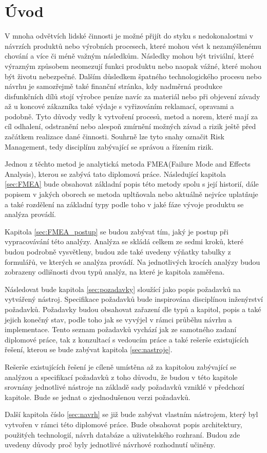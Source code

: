 \chapter{Úvod}
\label{sec:Uvod}
V mnoha odvětvích lidské činnosti je možné přijít do styku s nedokonalostmi v návrzích produktů nebo výrobních procesech, které mohou vést k nezamýšlenému chování a více či méně važným následkům. Následky mohou být triviální, které výrazným způsobem neomezují funkci produktu nebo naopak vážné, které mohou být životu nebezpečné. Dalším důsledkem špatného technologického procesu nebo návrhu je samozřejmě také finanční stránka, kdy nadměrná produkce disfunkčních dílů stojí výrobce peníze navíc za materiál nebo při objevení závady až u koncové zákazníka také výdaje s vyřizováním reklamací, opravami a podobně. Tyto důvody vedly k vytvoření procesů, metod a norem, které mají za cíl odhalení, odstranění nebo alespoň zmírnění možných závad a rizik ještě před začátkem realizace dané činnosti. Souhrně lze tyto snahy označit Risk Management, tedy disciplínu zabývající se správou a řízením rizik. 

Jednou z těchto metod je analytická metoda FMEA(Failure Mode and Effects Analysis), kterou se zabývá tato diplomová práce. Následující kapitola  \ref{sec:FMEA} bude obsahovat základní popis této metody spolu s její historií, dále popisem v jakých oborech se metoda upltňovala nebo aktuálně nejvíce uplatňuje a také rozdělení na základní typy podle toho v jaké fáze vývoje produktu se analýza provádí.

Kapitola \ref{sec:FMEA_postup} se budou zabývat tím, jaký je postup při vypracovávání této analýzy. Analýza se skládá celkem ze sedmi kroků, které budou podrobně vysvětleny, budou zde také uvedeny výňatky tabulky z formulářů, ve kterých se analýza provádí. Na jednotlivých krocích analýzy budou zobrazeny odlišnosti dvou typů analýz, na které je kapitola zaměřena.

Následovat bude kapitola \ref{sec:pozadavky} sloužící jako popis požadavků na vytvářený nástroj. Specifikace požadavků bude inspirována disciplínou inženýrství požadavků. Požadavky budou obsahovat zařazení dle typů a kapitol, popis a také jejich konečný stav, podle toho jak se vyvýjel v rámci průběhu návrhu a implementace. Tento seznam požadavků vychází jak ze samotného zadaní diplomové práce, tak z konzultací s vedoucím práce a také rešerše existujících řešení, kterou se bude zabývat kapitola \ref{sec:nastroje}. 

Rešerše existujících řešení je cíleně umístěna až za kapitolou zabývající se analýzou a specifikací požadavků z toho důvodu, že budou v této kapitole srovnány jednotlivé nástroje na základě sady požadavků vzniklé v předchozí kapitole. Bude se jednat o zjednodušenou verzi požadavků. 

Další kapitola číslo \ref{sec:navrh} se již bude zabývat vlastním nástrojem, který byl vytvořen v rámci této diplomové práce. Bude obsahovat popis architektury, použitých technologií, návrh databáze a uživatelského rozhraní. Budou zde uvedeny důvody proč byly jednotlivé návrhové rozhodnutí učiněny. 
\endinput